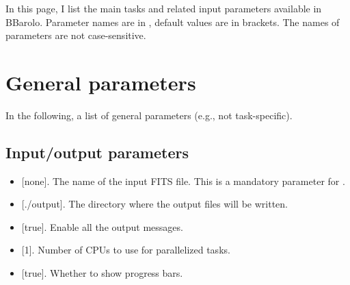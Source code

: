 \documentclass[letterpaper,10pt,english]{sphinxmanual}
\begin{document}
In this page, I list the main tasks and related input parameters available in BBarolo. Parameter names are in , default values are in brackets. The names of parameters are not case-sensitive.


\section{General parameters}
\label{\detokenize{tasks:general-parameters}}
In the following, a list of general parameters (e.g., not task-specific).


\subsection{Input/output parameters}
\label{\detokenize{tasks:input-output-parameters}}\begin{itemize}
\item {} 
 {[}none{]}. The name of the input FITS file. This is a mandatory parameter for .

\item {} 
 {[}./output{]}. The directory where the output files will be written.

\item {} 
 {[}true{]}. Enable all the output messages.

\item {} 
 {[}1{]}. Number of CPUs to use for parallelized tasks.

\item {} 
 {[}true{]}. Whether to show progress bars.

\end{itemize}
\end{document}
